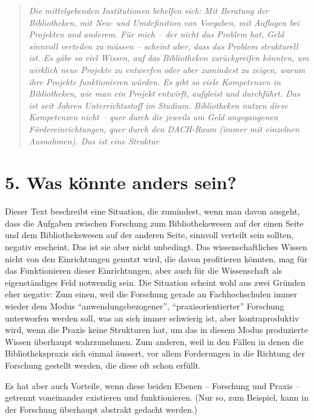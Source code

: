 \documentclass[a4paper,
fontsize=11pt,
oneside,
numbers=noperiodatend,
parskip=half-,
bibliography=totoc,
final
]{scrartcl}
\begin{document}
\begin{quote}
\emph{Die mittelgebenden Institutionen behelfen sich: Mit Beratung der
Bibliotheken, mit Neu- und Umdefinition von Vorgaben, mit Auflagen bei
Projekten und anderem. Für mich -- der nicht das Problem hat, Geld
sinnvoll verteilen zu müssen -- scheint aber, dass das Problem
strukturell ist. Es gäbe so viel Wissen, auf das Bibliotheken
zurückgreifen könnten, um wirklich neue Projekte zu entwerfen oder aber
zumindest zu zeigen, warum ihre Projekte funktionieren würden. Es gibt
so viele Kompetenzen in Bibliotheken, wie man ein Projekt entwirft,
aufgleist und durchführt. Das ist seit Jahren Unterrichtsstoff im
Studium. Bibliotheken nutzen diese Kompetenzen nicht -- quer durch die
jeweils um Geld angegangenen Fördereinrichtungen, quer durch den
DACH-Raum (immer mit einzelnen Ausnahmen). Das ist eine Struktur.}
\end{quote}

\hypertarget{was-kuxf6nnte-anders-sein}{%
\section{5. Was könnte anders
sein?}\label{was-kuxf6nnte-anders-sein}}

Dieser Text beschreibt eine Situation, die zumindest, wenn man davon
ausgeht, dass die Aufgaben zwischen Forschung zum Bibliothekswesen auf
der einen Seite und dem Bibliothekswesen auf der anderen Seite, sinnvoll
verteilt sein sollten, negativ erscheint. Das ist sie aber nicht
unbedingt. Das wissenschaftliches Wissen nicht von den Einrichtungen
genutzt wird, die davon profitieren könnten, mag für das Funktionieren
dieser Einrichtungen, aber auch für die Wissenschaft als eigenständiges
Feld notwendig sein. Die Situation scheint wohl aus zwei Gründen eher
negativ: Zum einen, weil die Forschung gerade an Fachhochschulen immer
wieder dem Modus \enquote{anwendungsbezogener},
\enquote{praxisorientierter} Forschung unterworfen werden soll, was an
sich immer schwierig ist, aber kontraproduktiv wird, wenn die Praxis
keine Strukturen hat, um das in diesem Modus produzierte Wissen
überhaupt wahrzunehmen. Zum anderen, weil in den Fällen in denen die
Bibliothekspraxis sich einmal äussert, vor allem Forderungen in die
Richtung der Forschung gestellt werden, die diese oft schon erfüllt.

Es hat aber auch Vorteile, wenn diese beiden Ebenen -- Forschung und
Praxis -- getrennt voneinander existieren und funktionieren. (Nur so,
zum Beispiel, kann in der Forschung überhaupt abstrakt gedacht werden.)
\end{document}
